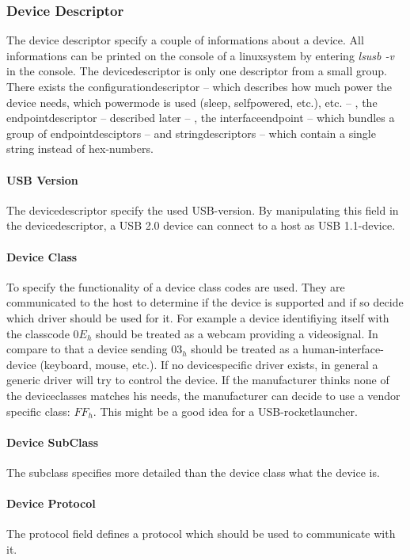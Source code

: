 \documentclass{acm_proc_article-sp}
\begin{document}
\subsubsection{Device Descriptor} %
The device descriptor specify a couple of informations about a device.
All informations can be printed on the console of a linuxsystem by entering \emph{lsusb -v} in the console. The devicedescriptor is only one descriptor from a small group. There exists the configurationdescriptor -- which describes how much power the device needs, which powermode is used (sleep, selfpowered, etc.), etc. -- , the endpointdescriptor -- described later -- , the interfaceendpoint -- which bundles a group of endpointdesciptors -- and stringdescriptors -- which contain a single string instead of hex-numbers.
\paragraph{USB Version}
The devicedescriptor specify the used USB-version. By manipulating this field in the devicedescriptor, a USB 2.0 device can connect to a host as USB 1.1-device.
\paragraph{Device Class}
To specify the functionality of a device class codes are used. They are communicated to the host to determine if the device is supported and if so decide which driver should be used for it. For example a device identifiying itself with the classcode $0E_h$ should be treated as a webcam providing a videosignal. In compare to that a device sending $03_h$ should be treated as a human-interface-device (keyboard, mouse, etc.).
If no devicespecific driver exists, in general a generic driver will try to control the device. If the manufacturer thinks none of the deviceclasses matches his needs, the manufacturer can decide to use a vendor specific class: $FF_h$. This might be a good idea for a USB-rocketlauncher.
\paragraph{Device SubClass}
The subclass specifies more detailed than the device class what the device is.
\paragraph{Device Protocol}
The protocol field defines a protocol which should be used to communicate with it.
\end{document}
